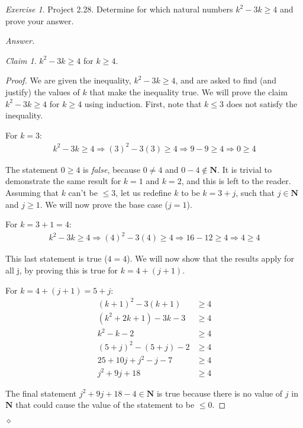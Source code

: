 \documentclass[12pt,oneside]{amsart}
\theoremstyle{remark}
\newtheorem{exer}{Exercise}
\newtheorem{claim}{Claim}[exer]
\newcommand{\bfN}{\mathbf{N}}
\newenvironment{answer}{\bigskip\noindent\emph{Answer.}}{\hfill$\diamond$\newline}
\begin{document}
\newpage
\begin{exer}
Project 2.28. Determine for which natural numbers $k^2 - 3k \geq 4$
and prove your answer.
\end{exer}

\begin{answer}
\begin{claim}
$k^2 - 3k \geq 4$ for $k \geq 4$.
\end{claim}

\begin{proof}
We are given the inequality, $k^2 - 3k \geq 4$, and are asked to find (and justify) the values of $k$ that make the inequality true. We will prove the claim $k^2 - 3k \geq 4$ for $k \geq 4$ using induction. First, note that $k \leq 3$ does not satisfy the inequality.

For $k = 3$:
\begin{align*}
    k^2 - 3k \geq 4 \Rightarrow
(3)^2 - 3(3) \geq 4 \Rightarrow
       9 - 9 \geq 4 \Rightarrow
           0 \geq 4
\end{align*}

The statement $0 \geq 4$ is \emph{false}, because $0 \neq 4$ and $0 - 4 \notin \bfN$. It is trivial to demonstrate the same result for $k = 1$ and $k = 2$, and this is left to the reader. Assuming that $k$ can't be $\leq 3$, let us redefine $k$ to be $k = 3 + j$, such that $j \in \bfN$ and $j \geq 1$. We will now prove the base case ($j = 1$).

For $k = 3 + 1 = 4$:
\begin{align*}
    k^2 - 3k \geq 4 \Rightarrow
(4)^2 - 3(4) \geq 4 \Rightarrow
     16 - 12 \geq 4 \Rightarrow
           4 \geq 4
\end{align*}

This last statement is true ($4 = 4$). We will now show that the results apply for all j, by proving this is true for $k = 4 + (j + 1)$.

For $k = 4 + (j + 1) = 5 + j$:
\begin{align*}
   (k + 1)^2 - 3(k + 1) &\geq 4 \\
(k^2 + 2k + 1) - 3k - 3 &\geq 4 \\
            k^2 - k - 2 &\geq 4 \\
(5 + j)^2 - (5 + j) - 2 &\geq 4 \\
 25 + 10j + j^2 - j - 7 &\geq 4 \\
          j^2 + 9j + 18 &\geq 4
\end{align*}

The final statement $j^2 + 9j + 18 - 4 \in \bfN$ is true because there is no value of $j$ in $\bfN$ that could cause the value of the statement to be $\leq 0$.
\end{proof}
\end{answer}
\end{document}
